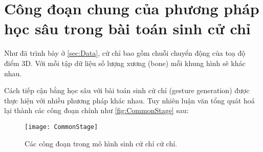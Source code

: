 

\section{Công đoạn chung của phương pháp học sâu trong bài toán sinh cử chỉ}
\label{sec:commonstage}

Như đã trình bày ở \autoref{sec:Data}, cử chỉ bao gồm chuỗi chuyển động của toạ độ điểm 3D. Với mỗi tập dữ liệu số lượng xương (bone) mỗi khung hình sẽ khác nhau. 

Cách tiếp cận bằng học sâu với bài toán sinh cử chỉ (gesture generation) được thực hiện với nhiều phương pháp khác nhau. Tuy nhiên luận văn tổng quát hoá lại thành các công đoạn chính như \autoref{fig:CommonStage} sau:

\begin{figure}[H]
	\centering
	\texttt{[image: CommonStage]}
	\caption{Các công đoạn trong mô hình sinh cử chỉ cử chỉ.}
	\label{fig:CommonStage}
\end{figure}

